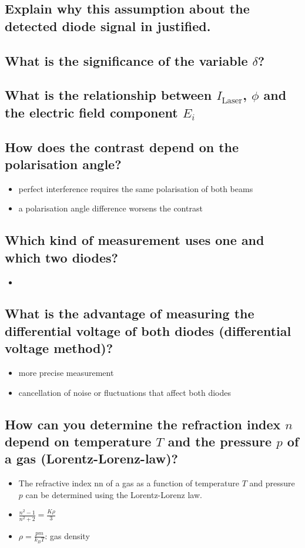 \subsection*{Explain why this assumption about the detected diode signal in justified.}
\subsection*{What is the significance of the variable $\delta$?}
\subsection*{What is the relationship between $I_\text{Laser}$, $\phi$ and the electric field component $E_i$}

\subsection*{How does the contrast depend on the polarisation angle?}
\begin{itemize}
    \item perfect interference requires the same polarisation of both beams 
    \item a polarisation angle difference worsens the contrast
\end{itemize}

\subsection*{Which kind of measurement uses one and which two diodes?}
\begin{itemize}
    \item 
\end{itemize}
\subsection*{What is the advantage of measuring the differential voltage of both diodes (differential voltage method)?}
\begin{itemize}
    \item more precise measurement
    \item cancellation of noise or fluctuations that affect both diodes
\end{itemize}

\subsection*{How can you determine the refraction index $n$ depend on temperature $T$ and the pressure $p$ of a gas (Lorentz-Lorenz-law)?}
\begin{itemize}
    \item The refractive index nn of a gas as a function of temperature $T$ and pressure $p$ can be determined using the Lorentz-Lorenz law. 
    \item $\frac{n^2-1}{n^2+2}=\frac{K\rho}{3}$
    \item $\rho=\frac{pm}{k_BT}$: gas density 
\end{itemize}